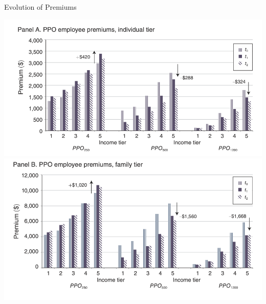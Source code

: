 \documentclass[xcolor=pdftex,dvipsnames,table,mathserif,aspectratio=169]{beamer}
\begin{document}
\begin{frame}{Evolution of Premiums}
\begin{center}
\includegraphics[scale=.37]{resources/handel_f2a.png}
\includegraphics[scale=.37]{resources/handel_f2b.png}
\end{center}
\end{frame}
\end{document}
